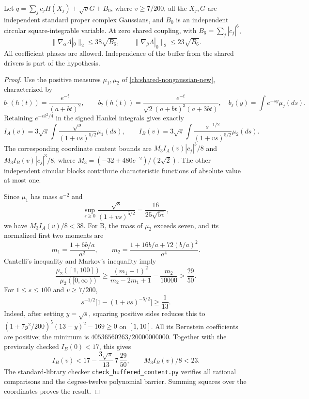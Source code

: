 \begin{theorem}
Let $q=\sum_jc_jH(X_j)+\sqrt vG+B_0$, where $v\ge7/200$, all the
$X_j,G$ are independent standard proper complex Gaussians, and $B_0$ is
an independent circular square-integrable variable. At zero shared
coupling, with $B_6=\sum_j|c_j|^6$,
\[
 \|\nabla_\alpha\Lambda|_0\|_2\le38\sqrt{B_6},\qquad
 \|\nabla_\beta\Lambda|_0\|_2\le23\sqrt{B_6}.
\]
All coefficient phases are allowed. Independence of the buffer from the
shared drivers is part of the hypothesis.
\end{theorem}
\begin{proof}
Use the positive measures $\mu_1,\mu_2$ of
\autoref{ch:shared-nongaussian-new}, characterized by
\[
 b_1(h(t))=\frac{e^{-t}}{(a+bt)^2},\qquad
 b_2(h(t))=\frac{e^{-t}}{\sqrt2(a+bt)^3(a+3bt)},
 \quad b_j(y)=\int e^{-sy}\mu_j(ds).
\]
Retaining $e^{-vk^2/4}$ in the signed Hankel integrals gives exactly
\[
 I_A(v)=3\sqrt\pi\int\frac{\sqrt s}{(1+vs)^{5/2}}\mu_1(ds),\qquad
 I_B(v)=3\sqrt\pi\int\frac{s^{-1/2}}{(1+vs)^{5/2}}\mu_2(ds).
\]
The corresponding coordinate content bounds are
$M_3I_A(v)|c_j|^3/8$ and $M_3I_B(v)|c_j|^3/8$, where
$M_3=(-32+480e^{-2})/(2\sqrt2)$.
The other independent circular blocks contribute characteristic
functions of absolute value at most one.

Since $\mu_1$ has mass $a^{-2}$ and
\[
 \sup_{s\ge0}\frac{\sqrt s}{(1+vs)^{5/2}}
 =\frac{16}{25\sqrt{5v}},
\]
we have $M_3I_A(v)/8<38$.
For B, the mass of $\mu_2$ exceeds seven, and its normalized first two
moments are
\[
 m_1=\frac{1+6b/a}{a^2},\qquad
 m_2=\frac{1+16b/a+72(b/a)^2}{a^4}.
\]
Cantelli's inequality and Markov's inequality imply
\[
 \frac{\mu_2([1,100])}{\mu_2([0,\infty))}
 \ge\frac{(m_1-1)^2}{m_2-2m_1+1}-\frac{m_2}{10000}
 >\frac{29}{50}.
\]
For $1\le s\le100$ and $v\ge7/200$,
\[
 s^{-1/2}\bigl[1-(1+vs)^{-5/2}\bigr]\ge\frac1{13}.
\]
Indeed, after setting $y=\sqrt s$, squaring positive sides reduces this
to $(1+7y^2/200)^5(13-y)^2-169\ge0$ on $[1,10]$. All its Bernstein
coefficients are positive; the minimum is
$40536560263/20000000000$. Together with the previously checked
$I_B(0)<17$, this gives
\[
 I_B(v)<17-\frac{3\sqrt\pi}{13}\,7\,\frac{29}{50},
 \qquad M_3I_B(v)/8<23.
\]
The standard-library checker \texttt{check\_buffered\_content.py}
verifies all rational comparisons and the degree-twelve polynomial
barrier. Summing squares over the coordinates proves the result.
\end{proof}

